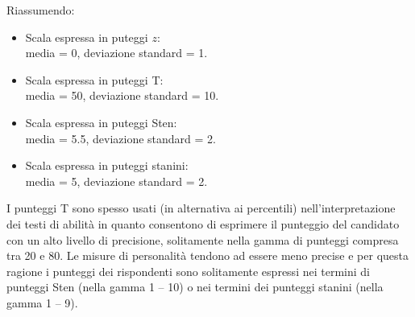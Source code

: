 %
%
%
%
%
%
%



Riassumendo:

\begin{itemize}
\item Scala espressa in puteggi $z$:\\ media = 0, deviazione standard = 1.
\item Scala espressa in puteggi T:\\ media = 50, deviazione standard = 10.
\item Scala espressa in puteggi Sten:\\ media = 5.5, deviazione standard = 2.
\item Scala espressa in puteggi stanini:\\ media = 5, deviazione standard = 2.
\end{itemize}
I punteggi T sono spesso usati (in alternativa ai percentili) nell'interpretazione dei testi di abilità in quanto consentono di esprimere il punteggio del candidato con un alto livello di precisione, solitamente nella gamma di punteggi compresa tra 20 e 80.
 Le misure di personalità tendono ad essere meno precise e per questa ragione i punteggi dei rispondenti sono solitamente  espressi nei termini di punteggi Sten (nella gamma 1 -- 10) o nei termini dei punteggi stanini (nella gamma 1 -- 9).



